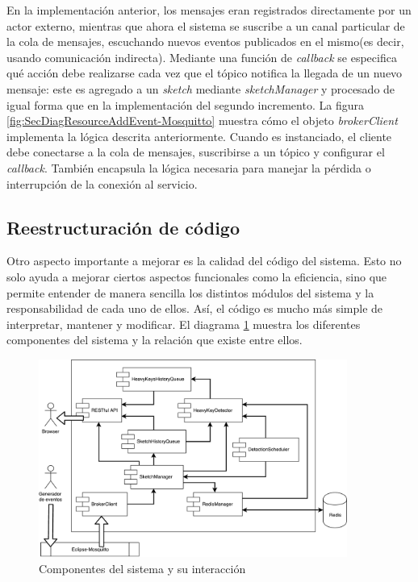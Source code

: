 \documentclass[a4paper,10pt, oneside]{article}
\begin{document}
En la implementación anterior, los mensajes eran registrados directamente por un actor externo, mientras que ahora el sistema se suscribe a un canal particular de la cola de mensajes, escuchando nuevos eventos publicados en el mismo(es decir, usando comunicación indirecta). Mediante una función de \textit{callback} se especifica qué acción debe realizarse cada vez que el tópico notifica la llegada de un nuevo mensaje: este es agregado a un \textit{sketch} mediante  \textit{sketchManager} y procesado de igual forma que en la implementación del segundo incremento.
La figura \ref{fig:SecDiagResourceAddEvent-Mosquitto} muestra cómo el objeto \textit{brokerClient} implementa la lógica descrita anteriormente. Cuando es instanciado, el cliente debe conectarse a la cola de mensajes,  suscribirse a un tópico y configurar el \textit{callback}. También encapsula la lógica necesaria para manejar la pérdida o interrupción de la conexión al servicio.

\subsection{Reestructuración de código}
Otro aspecto importante a mejorar es la calidad del código del sistema. Esto no solo ayuda a mejorar ciertos aspectos funcionales como la eficiencia, sino que permite entender de manera sencilla los distintos módulos del sistema y la responsabilidad de cada uno de ellos. Así, el código es mucho más simple de interpretar, mantener y modificar.
El diagrama \ref{fig:system_components} muestra los diferentes componentes del sistema y la relación que existe entre ellos.

\begin{figure}[htbp]
	\centering
	\includegraphics[width=0.9\textwidth]{./graph/system_components.pdf}
	\caption{Componentes del sistema y su interacción}
	\label{fig:system_components}
\end{figure}
\end{document}
